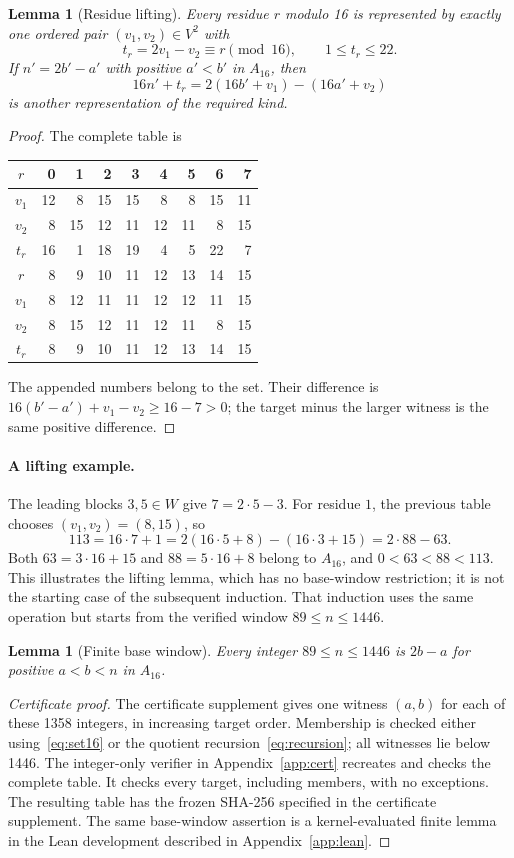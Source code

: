 \documentclass[11pt]{article}
\newtheorem{lemma}[theorem]{Lemma}
\theoremstyle{definition}\newtheorem{definition}[theorem]{Definition}
\theoremstyle{remark}\newtheorem{remark}[theorem]{Remark}
\numberwithin{equation}{section}
\begin{document}
\begin{lemma}[Residue lifting]\label{lem:lift16}
Every residue $r$ modulo 16 is represented by exactly one ordered pair $(v_1,v_2)\in V^2$ with
\[
t_r=2v_1-v_2\equiv r\pmod{16},\qquad 1\le t_r\le22.
\]
If $n'=2b'-a'$ with positive $a'<b'$ in $A_{16}$, then
\[
16n'+t_r=2(16b'+v_1)-(16a'+v_2)
\]
is another representation of the required kind.
\end{lemma}
\begin{proof}
The complete table is
\begin{center}\small
\begin{tabular}{c|rrrrrrrr}
$r$&0&1&2&3&4&5&6&7\\\hline
$v_1$&12&8&15&15&8&8&15&11\\
$v_2$&8&15&12&11&12&11&8&15\\
$t_r$&16&1&18&19&4&5&22&7\\[3pt]\hline
$r$&8&9&10&11&12&13&14&15\\\hline
$v_1$&8&12&11&11&12&12&11&15\\
$v_2$&8&15&12&11&12&11&8&15\\
$t_r$&8&9&10&11&12&13&14&15
\end{tabular}
\end{center}
The appended numbers belong to the set. Their difference is
$16(b'-a')+v_1-v_2\ge16-7>0$; the target minus the larger witness is the same positive difference.
\end{proof}

\paragraph{A lifting example.}
The leading blocks $3,5\in W$ give $7=2\cdot5-3$. For residue $1$, the
previous table chooses $(v_1,v_2)=(8,15)$, so
\[
113=16\cdot7+1=2(16\cdot5+8)-(16\cdot3+15)=2\cdot88-63.
\]
Both $63=3\cdot16+15$ and $88=5\cdot16+8$ belong to $A_{16}$, and
$0<63<88<113$. This illustrates the lifting lemma, which has no base-window
restriction; it is not the starting case of the subsequent induction. That
induction uses the same operation but starts from the verified window
$89\le n\le1446$.

\begin{lemma}[Finite base window]\label{lem:base}
Every integer $89\le n\le1446$ is $2b-a$ for positive $a<b<n$ in $A_{16}$.
\end{lemma}
\begin{proof}[Certificate proof]
The certificate supplement gives one witness $(a,b)$ for each of these 1358 integers, in increasing target order. Membership is checked either using~\eqref{eq:set16} or the quotient recursion~\eqref{eq:recursion}; all witnesses lie below 1446. The integer-only verifier in Appendix~\ref{app:cert} recreates and checks the complete table. It checks every target, including members, with no exceptions. The resulting table has the frozen SHA-256 specified in the certificate supplement. The same base-window assertion is a kernel-evaluated finite lemma in the Lean development described in Appendix~\ref{app:lean}.
\end{proof}
\end{document}

